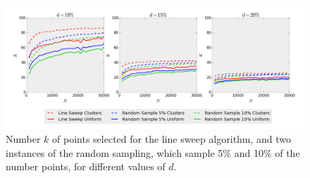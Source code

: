 \begin{figure}[!h] 
	\centering
	\includegraphics[width=\linewidth]{Pictures/ls_rs_k} 
	\caption[Number $k$ of points selected for Line Sweep and Random Sampling algorithms.]{Number $k$ of points selected for the line sweep algorithm, and two instances of the random sampling, which sample 5\% and 10\% of the number points, for different values of $d$.}
	\label{fig:ls_rs_k} 
\end{figure}